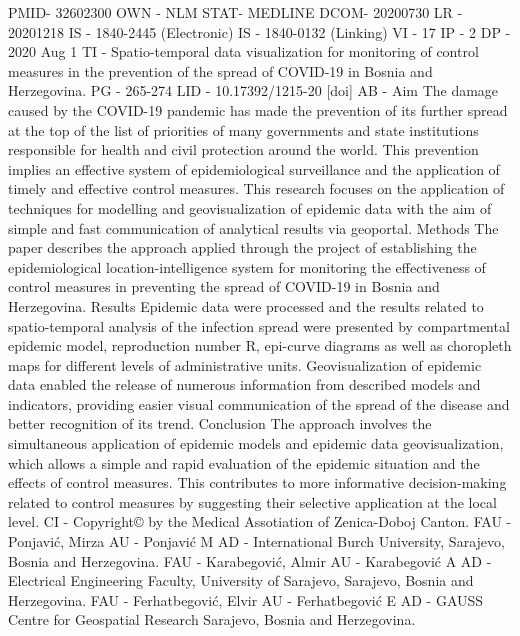 PMID- 32602300
OWN - NLM
STAT- MEDLINE
DCOM- 20200730
LR  - 20201218
IS  - 1840-2445 (Electronic)
IS  - 1840-0132 (Linking)
VI  - 17
IP  - 2
DP  - 2020 Aug 1
TI  - Spatio-temporal data visualization for monitoring of control measures in the 
      prevention of the spread of COVID-19 in Bosnia and Herzegovina.
PG  - 265-274
LID - 10.17392/1215-20 [doi]
AB  - Aim The damage caused by the COVID-19 pandemic has made the prevention of its 
      further spread at the top of the list of priorities of many governments and state 
      institutions responsible for health and civil protection around the world. This 
      prevention implies an effective system of epidemiological surveillance and the 
      application of timely and effective control measures. This research focuses on the 
      application of techniques for modelling and geovisualization of epidemic data with 
      the aim of simple and fast communication of analytical results via geoportal. 
      Methods The paper describes the approach applied through the project of establishing 
      the epidemiological location-intelligence system for monitoring the effectiveness of 
      control measures in preventing the spread of COVID-19 in Bosnia and Herzegovina. 
      Results Epidemic data were processed and the results related to spatio-temporal 
      analysis of the infection spread were presented by compartmental epidemic model, 
      reproduction number R, epi-curve diagrams as well as choropleth maps for different 
      levels of administrative units. Geovisualization of epidemic data enabled the 
      release of numerous information from described models and indicators, providing 
      easier visual communication of the spread of the disease and better recognition of 
      its trend. Conclusion The approach involves the simultaneous application of epidemic 
      models and epidemic data geovisualization, which allows a simple and rapid 
      evaluation of the epidemic situation and the effects of control measures. This 
      contributes to more informative decision-making related to control measures by 
      suggesting their selective application at the local level.
CI  - Copyright© by the Medical Assotiation of Zenica-Doboj Canton.
FAU - Ponjavić, Mirza
AU  - Ponjavić M
AD  - International Burch University, Sarajevo, Bosnia and Herzegovina.
FAU - Karabegović, Almir
AU  - Karabegović A
AD  - Electrical Engineering Faculty, University of Sarajevo, Sarajevo, Bosnia and 
      Herzegovina.
FAU - Ferhatbegović, Elvir
AU  - Ferhatbegović E
AD  - GAUSS Centre for Geospatial Research Sarajevo, Bosnia and Herzegovina.
